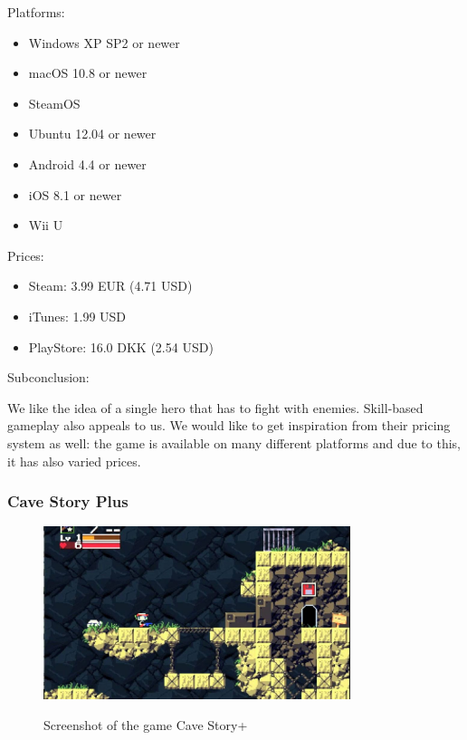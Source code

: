 \documentclass[12p]{article}
\begin{document}
Platforms:

\begin{itemize}
  \item Windows XP SP2 or newer
  \item macOS 10.8 or newer
  \item SteamOS
  \item Ubuntu 12.04 or newer
  \item Android 4.4 or newer
  \item iOS 8.1 or newer
  \item Wii U
\end{itemize}

Prices:

\begin{itemize}
 \item Steam: 3.99 EUR (4.71 USD)
 \item iTunes: 1.99 USD
 \item PlayStore: 16.0 DKK (2.54 USD)
\end{itemize}

Subconclusion:

We like the idea of a single hero that has to fight with enemies. Skill-based gameplay also appeals to us. We would like to get inspiration from their pricing system as well: the game is available on many different platforms and due to this, it has also varied prices.



\newpage
\subsubsection[Cave Story Plus]{Cave Story Plus \cite{CaveStoryPlusSteam}}

\begin{figure}[ht]
 \center
 \includegraphics[width=0.8\textwidth]{StateOfTheArtScreenshots/cave_story_plus}
 \label{sec:StateOfTheArt_Screenshots_CaveStoryPlus}
 \caption{Screenshot of the game Cave Story+ \cite{CaveStoryPlusScreenshot}}
\end{figure}
\end{document}
